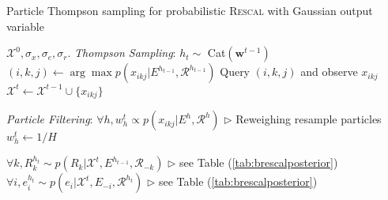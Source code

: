 \begin{algorithm}[t!]
   \caption{Particle Thompson sampling for probabilistic \textsc{Rescal} with Gaussian output variable}
   \label{alg:smc}
\begin{algorithmic}
    $\mathcal{X}^{0}, \sigma_x, \sigma_e, \sigma_r$.
   \STATE \textit{Thompson Sampling}:
   \STATE $h_t \sim $ Cat$(\mathbf{w}^{t-1})$
   \STATE $(i,k,j) \leftarrow \arg\max p(x_{ikj}| E^{h_{t-1}}, \mathcal{R}^{h_{t-1}})$
   \STATE Query $(i,k,j)$ and observe $x_{ikj}$
   \STATE $\mathcal{X}^{t} \leftarrow \mathcal{X}^{t-1} \cup \{x_{ikj}\}$

   \STATE \textit{Particle Filtering}:
   \STATE $\forall h, w_h^{t} \propto p(x_{ikj} | E^{h}, \mathcal{R}^{h})$   \hfill $\triangleright$ Reweighing
   \STATE resample particles
   \STATE $w_h^{t} \leftarrow 1/H$
   \ENDIF

   \STATE $\forall k, R_k^{h_t} \sim p(R_k | \mathcal{X}^{t}, E^{h_{t-1}}, \mathcal{R}_{-k})$   \hfill $\triangleright$ see Table (\ref{tab:brescalposterior})
   \STATE $\forall i, e^{h_t}_i \sim p(e_i | \mathcal{X}^{t}, E_{-i}, \mathcal{R}^{h_{t}})$ \hfill $\triangleright$ see Table (\ref{tab:brescalposterior})
   \ENDFOR

   \ENDFOR
\end{algorithmic}
\end{algorithm}
